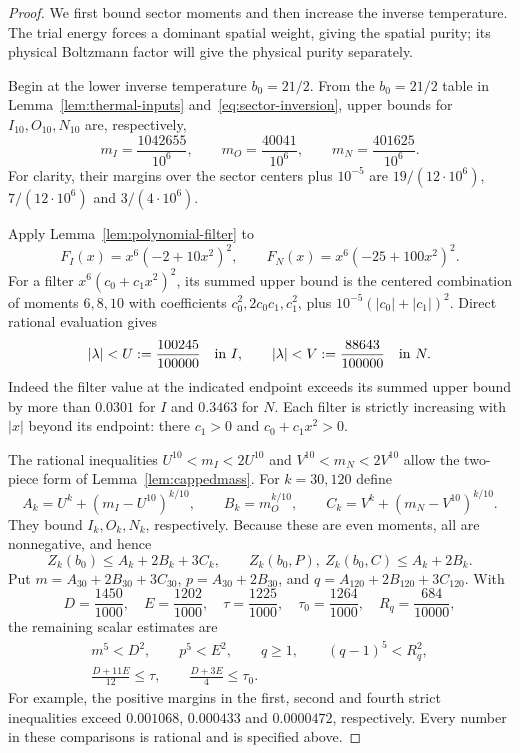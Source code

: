 \begin{proof}
We first bound sector moments and then increase the inverse temperature.
The trial energy forces a dominant spatial weight, giving the spatial
purity; its physical Boltzmann factor will give the physical purity
separately.

Begin at the lower inverse temperature $b_0=21/2$.  From the $b_0=21/2$ table in
Lemma~\ref{lem:thermal-inputs} and~\eqref{eq:sector-inversion}, upper bounds
for $I_{10},O_{10},N_{10}$ are, respectively,
\[
 m_I=\frac{1042655}{10^6},\qquad
 m_O=\frac{40041}{10^6},\qquad
 m_N=\frac{401625}{10^6}.
\]
For clarity, their margins over the sector centers plus $10^{-5}$ are
$19/(12\cdot10^6)$, $7/(12\cdot10^6)$ and $3/(4\cdot10^6)$.

Apply Lemma~\ref{lem:polynomial-filter} to
\[
 F_I(x)=x^6(-2+10x^2)^2,\qquad
 F_N(x)=x^6(-25+100x^2)^2.
\]
For a filter $x^6(c_0+c_1x^2)^2$, its summed upper bound is the centered
combination of moments $6,8,10$ with coefficients $c_0^2,2c_0c_1,c_1^2$,
plus $10^{-5}(|c_0|+|c_1|)^2$.  Direct rational evaluation gives
\[
 |\lambda|<U:=\frac{100245}{100000}\quad\hbox{in }I,
 \qquad
 |\lambda|<V:=\frac{88643}{100000}\quad\hbox{in }N.
\]
Indeed the filter value at the indicated endpoint exceeds its summed upper
bound by more than $0.0301$ for $I$ and $0.3463$ for $N$.
Each filter is strictly increasing with $|x|$ beyond its endpoint: there
$c_1>0$ and $c_0+c_1x^2>0$.

The rational inequalities
$U^{10}<m_I<2U^{10}$ and $V^{10}<m_N<2V^{10}$ allow the two-piece form
of Lemma~\ref{lem:cappedmass}.  For $k=30,120$ define
\[
 A_k=U^k+(m_I-U^{10})^{k/10},\qquad
 B_k=m_O^{k/10},\qquad
 C_k=V^k+(m_N-V^{10})^{k/10}.
\]
They bound $I_k,O_k,N_k$, respectively.  Because these are even moments,
all are nonnegative, and hence
\begin{equation}\label{eq:short-moment-upper}
 Z_k(b_0)\le A_k+2B_k+3C_k,\qquad
 Z_k(b_0,P),\ Z_k(b_0,C)\le A_k+2B_k.
\end{equation}
Put $m=A_{30}+2B_{30}+3C_{30}$, $p=A_{30}+2B_{30}$, and
$q=A_{120}+2B_{120}+3C_{120}$.  With
\[
 D=\frac{1450}{1000},\quad E=\frac{1202}{1000},\quad
 \tau=\frac{1225}{1000},\quad\tau_0=\frac{1264}{1000},\quad
 R_q=\frac{684}{10000},
\]
the remaining scalar estimates are
\begin{equation}\label{eq:seed60-scalars}
\begin{gathered}
 m^5<D^2,\qquad p^5<E^2,\qquad
 q\ge1,\qquad (q-1)^5<R_q^2,\\
 \frac{D+11E}{12}\le\tau,\qquad
 \frac{D+3E}{4}\le\tau_0.
\end{gathered}
\end{equation}
For example, the positive margins in the first, second and fourth strict
inequalities exceed $0.001068$, $0.000433$ and $0.0000472$, respectively.
Every number in these comparisons is rational and is specified above.


\end{proof}
